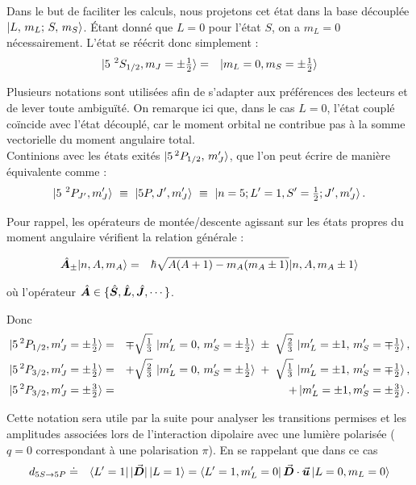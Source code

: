 Dans le but de faciliter les calculs, nous projetons cet état dans la base découplée $\ket{L,\,m_L;\,S,\,m_S}$. Étant donné que $L = 0$ pour l’état $S$, on a $m_L = 0$ nécessairement. L’état se réécrit donc simplement :
\begin{eqnarray*}
	\ket{ 5{~}^2S_{1/2} , m_J = \pm \tfrac12  } & = & \ket{  m_L = 0  , m_S= \pm \tfrac12  }  	
\end{eqnarray*}


Plusieurs notations sont utilisées afin de s’adapter aux préférences des lecteurs et de lever toute ambiguïté.
On remarque ici que, dans le cas $L = 0$, l’état couplé coïncide avec l’état découplé, car le moment orbital ne contribue pas à la somme vectorielle du moment angulaire total.\\

Continions avec les états exités $\ket{5\,^2P_{1/2},\,m_J'}$, que l’on peut écrire de manière équivalente comme :
\begin{eqnarray*}
	\ket{ 5{~}^2P_{J'} , m_J'  } ~\equiv~ \ket{ 5P , J'  , m_J' }  ~\equiv~ \ket{n=5 ; L'=1 , S'=\tfrac12 ;  J'  , m_J'  }.
\end{eqnarray*}

Pour rappel, les opérateurs de montée/descente agissant sur les états propres du moment angulaire vérifient la relation générale :


\begin{eqnarray}
	\hat{\bm{A}}_\pm \vert n , A , m	_A \rangle & = & \hbar \sqrt{A(A+1) - m_A(m_A\pm 1 ) } \vert n , A , m	_A \pm 1  \rangle
\end{eqnarray}

où l'opérateur $\hat{\bm{A}} \in \{ \hat{\bm{S}} , \hat{\bm{L}} , \hat{\bm{J}} , \cdots \}$.

Donc 
\begin{eqnarray*} 
	\ket{5\,^2P_{1/2},m_J' = \pm\tfrac12} &=& \mp\sqrt{\tfrac{1}{3}}\,\ket{ m_L'=0,\,m_S'=\pm\tfrac12} \;\pm\;\sqrt{\tfrac{2}{3}}\,\ket{m_L'=\pm 1,\,m_S'=\mp\tfrac12},\\ 
	\ket{5\,^2P_{3/2},m_J' = \pm\tfrac12} &=& +\sqrt{\tfrac{2}{3}}\,\ket{m_L'=0,\,m_S'=\pm\tfrac12} \;+\;\sqrt{\tfrac{1}{3}}\,\ket{ m_L'=\pm 1,\,m_S'=\mp\tfrac12},\\
	\ket{5\,^2P_{3/2},m_J' = \pm\tfrac32} &= & +\ket{m_L'=\pm 1 , m_S' = \pm \tfrac32}.  
\end{eqnarray*}
 
Cette notation sera utile par la suite pour analyser les transitions permises et les amplitudes associées lors de l’interaction dipolaire avec une lumière polarisée ($q = 0$ correspondant à une polarisation $\pi$). En se rappelant que dans ce cas 
\begin{eqnarray*}
	d_{\scriptstyle 5S \rightarrow 5P} & \doteq &\bra{L'=1} \vert \vec{{\bm{D}}} \vert \ket{L=1} = \bra{L'=1 , m_L' =0 }  \vec{{\bm{D}}} \cdot \vec{{\bm{u}}} \ket{L=0 , m_L = 0 }	
\end{eqnarray*}

